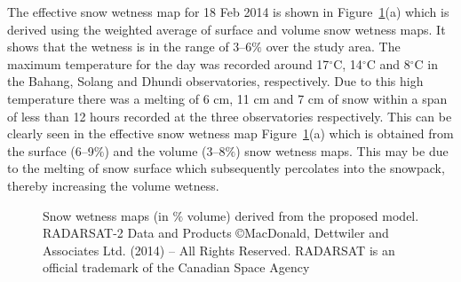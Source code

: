The effective snow wetness map for 18 Feb 2014 is shown in Figure~\ref{fig:proposed_results_fullpol2}(a) which is derived using the weighted average of surface and volume snow wetness maps. It shows that the wetness is in the range of 3--6$\%$ over the study area. The maximum temperature for the day was recorded around 17$^\circ$C, 14$^\circ$C and 8$^\circ$C in the Bahang, Solang and Dhundi observatories, respectively. Due to this high temperature there was a melting of 6 cm, 11 cm and 7 cm of snow within a span of less than 12 hours recorded at the three observatories respectively. This  can be clearly seen in the effective snow wetness map Figure~\ref{fig:proposed_results_fullpol2}(a) which is obtained from the surface (6--9$\%$) and the volume (3--8$\%$) snow wetness maps. This may be due to the melting of snow surface which subsequently percolates into the snowpack, thereby increasing the volume wetness.

\begin{figure}[!thpb]
	\centering
	\caption [Snow wetness maps of 18 Feb. 2014 and 20 Feb. 2014 Radarsat-2 data]{Snow wetness maps (in $\%$ volume) derived from the proposed model. RADARSAT-2 Data and Products ©MacDonald, Dettwiler and Associates Ltd. (2014) $–$ All Rights Reserved. RADARSAT is an official trademark of the Canadian Space Agency} 
	\label{fig:proposed_results_fullpol2}
\end{figure}

